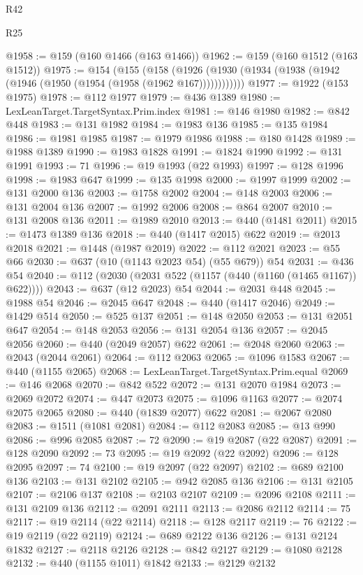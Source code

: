\begin{lexlean}{R42}
\begin{lexlean}{R25}
\begin{coremodule}
{{{{{{{{{{{{{{{{{{{{{{{{{{{{{{{{{{{{{{{{{{{{{{{{{{{{{{{{{{{{{{{{{{{{{{{{{{{{{{{{{{{{{{{{{{{{{{{{{{{{{{{{{{{{{{{{{{{{{{{{{{{{{{{{{{{{{{{{{{{{{{{{{{{{{{{{{{{{{{{{{{{{{{{{{{{{{{{{{{{{{{{{{{{{{{{{{{{{{{{@1958 := @159 (@160 @1466 (@163 @1466))
@1962 := @159 (@160 @1512 (@163 @1512))
@1975 := @154
    (@155
      (@158 (@1926 (@1930 (@1934 (@1938 (@1942 (@1946 (@1950 (@1954 (@1958 (@1962 @167))))))))))))
@1977 := @1922 (@153 @1975)
@1978 := @112 @1977
@1979 := @436 @1389
@1980 := LexLeanTarget.TargetSyntax.Prim.index
@1981 := @146 @1980
@1982 := @842 @448
@1983 := @131 @1982
@1984 := @1983 @136
@1985 := @135 @1984
@1986 := @1981 @1985
@1987 := @1979 @1986
@1988 := @180 @1428
@1989 := @1988 @1389
@1990 := @1983 @1828
@1991 := @1824 @1990
@1992 := @131 @1991
@1993 := 71
@1996 := @19 @1993 (@22 @1993)
@1997 := @128 @1996
@1998 := @1983 @647
@1999 := @135 @1998
@2000 := @1997 @1999
@2002 := @131 @2000 @136
@2003 := @1758 @2002
@2004 := @148 @2003
@2006 := @131 @2004 @136
@2007 := @1992 @2006
@2008 := @864 @2007
@2010 := @131 @2008 @136
@2011 := @1989 @2010
@2013 := @440 (@1481 @2011)
@2015 := @1473 @1389 @136
@2018 := @440 (@1417 @2015) @622
@2019 := @2013 @2018
@2021 := @1448 (@1987 @2019)
@2022 := @112 @2021
@2023 := @55 @66
@2030 := @637 (@10 (@1143 @2023 @54) (@55 @679)) @54
@2031 := @436 @54
@2040 := @112 (@2030 (@2031 @522 (@1157 (@440 (@1160 (@1465 @1167)) @622))))
@2043 := @637 (@12 @2023) @54
@2044 := @2031 @448
@2045 := @1988 @54
@2046 := @2045 @647
@2048 := @440 (@1417 @2046)
@2049 := @1429 @514
@2050 := @525 @137
@2051 := @148 @2050
@2053 := @131 @2051 @647
@2054 := @148 @2053
@2056 := @131 @2054 @136
@2057 := @2045 @2056
@2060 := @440 (@2049 @2057) @622
@2061 := @2048 @2060
@2063 := @2043 (@2044 @2061)
@2064 := @112 @2063
@2065 := @1096 @1583
@2067 := @440 (@1155 @2065)
@2068 := LexLeanTarget.TargetSyntax.Prim.equal
@2069 := @146 @2068
@2070 := @842 @522
@2072 := @131 @2070 @1984
@2073 := @2069 @2072
@2074 := @447 @2073
@2075 := @1096 @1163
@2077 := @2074 @2075 @2065
@2080 := @440 (@1839 @2077) @622
@2081 := @2067 @2080
@2083 := @1511 (@1081 @2081)
@2084 := @112 @2083
@2085 := @13 @990
@2086 := @996 @2085
@2087 := 72
@2090 := @19 @2087 (@22 @2087)
@2091 := @128 @2090
@2092 := 73
@2095 := @19 @2092 (@22 @2092)
@2096 := @128 @2095
@2097 := 74
@2100 := @19 @2097 (@22 @2097)
@2102 := @689 @2100 @136
@2103 := @131 @2102
@2105 := @942 @2085 @136
@2106 := @131 @2105
@2107 := @2106 @137
@2108 := @2103 @2107
@2109 := @2096 @2108
@2111 := @131 @2109 @136
@2112 := @2091 @2111
@2113 := @2086 @2112
@2114 := 75
@2117 := @19 @2114 (@22 @2114)
@2118 := @128 @2117
@2119 := 76
@2122 := @19 @2119 (@22 @2119)
@2124 := @689 @2122 @136
@2126 := @131 @2124 @1832
@2127 := @2118 @2126
@2128 := @842 @2127
@2129 := @1080 @2128
@2132 := @440 (@1155 @1011) @1842
@2133 := @2129 @2132
}}}}}}}}}}}}}}}}}}}}}}}}}}}}}}}}}}}}}}}}}}}}}}}}}}}}}}}}}}}}}}}}}}}}}}}}}}}}}}}}}}}}}}}}}}}}}}}}}}}}}}}}}}}}}}}}}}}}}}}}}}}}}}}}}}}}}}}}}}}}}}}}}}}}}}}}}}}}}}}}}}}}}}}}}}}}}}}}}}}}}}}}}}}}}}}}}}}}}}}
\end{coremodule}
\end{lexlean}
\end{lexlean}
